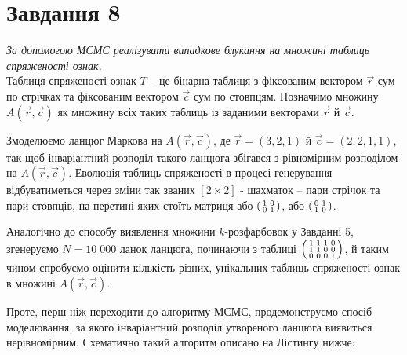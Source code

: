 \documentclass[a4paper,14pt]{extarticle} %
\numberwithin{equation}{section}
\begin{document}
\newpage
\section*{Завдання 8}

\textit{За допомогою МСМС реалізувати випадкове блукання на множині таблиць спряженості ознак.} \\

Таблиця спряженості ознак $T$ -- це бінарна таблиця з фіксованим вектором $\overrightarrow{r}$ сум по стрічках та фіксованим вектором $\overrightarrow{c}$ сум по стовпцям. Позначимо множину $A(\overrightarrow{r},\overrightarrow{c})$ як множину всіх таких таблиць із заданими векторами $\overrightarrow{r}$ й $\overrightarrow{c}$.

Змоделюємо ланцюг Маркова на $A(\overrightarrow{r},\overrightarrow{c})$, де $\overrightarrow{r}=(3,2,1)$ й $\overrightarrow{c}=(2,2,1,1)$, так щоб інваріантний розподіл такого ланцюга збігався з рівномірним розподілом на $A(\overrightarrow{r},\overrightarrow{c})$. Еволюція таблиць спряженості в процесі генерування відбуватиметься через зміни так званих $[2\times 2]$ - шахматок -- пари стрічок та пари стовпців, на перетині яких стоїть матриця або 
$
    \begin{psmallmatrix}
        1 & 0 \\
        0 & 1 \\
    \end{psmallmatrix}
$, або
$
    \begin{psmallmatrix}
        0 & 1 \\
        1 & 0 \\
    \end{psmallmatrix}
$. 

Аналогічно до способу виявлення множини $k$-розфарбовок у Завданні 5, згенеруємо $N=10\;000$ ланок ланцюга, починаючи з таблиці
$
    \begin{psmallmatrix}
        1 & 1 & 1 & 0 \\
        1 & 1 & 0 & 0 \\
        0 & 0 & 0 & 1 \\
    \end{psmallmatrix}
$, й таким чином спробуємо оцінити кількість різних, унікальних таблиць спряженості ознак в множині $A(\overrightarrow{r},\overrightarrow{c})$.

Проте, перш ніж переходити до алгоритму МСМС, продемонструємо спосіб моделювання, за якого інваріантний розподіл утвореного ланцюга виявиться нерівномірним. Схематично такий алгоритм описано на Лістингу нижче:
\end{document}
